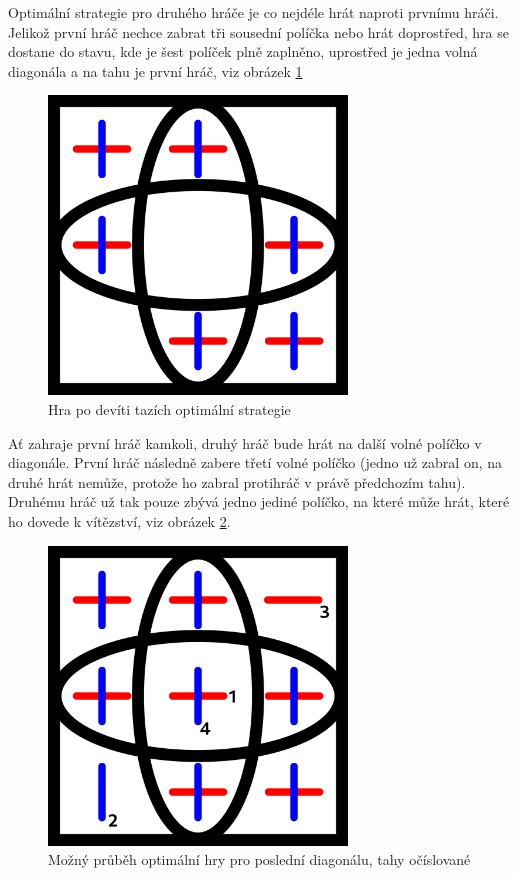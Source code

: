 Optimální strategie pro druhého hráče je co nejdéle hrát naproti prvnímu hráči.
Jelikož první hráč nechce zabrat tři sousední políčka nebo hrát doprostřed, hra
se dostane do stavu, kde je šest políček plně zaplněno, uprostřed je jedna
volná diagonála a na tahu je první hráč, viz obrázek \ref{fig:empty-diagonal}


\begin{figure}[h]
    \centering
    \includegraphics[width=300px]{img/empty-diagonal.png}
    \caption{Hra po devíti tazích optimální strategie}
    \label{fig:empty-diagonal}
\end{figure}

Ať zahraje první hráč kamkoli, druhý hráč bude hrát na další volné políčko v
diagonále. První hráč následně zabere třetí volné políčko (jedno už zabral on,
na druhé hrát nemůže, protože ho zabral protihráč v právě předchozím tahu).
Druhému hráč už tak pouze zbývá jedno jediné políčko, na které může hrát, které
ho dovede k vítězství, viz obrázek \ref{fig:last-diagonal}.

\begin{figure}[h]
    \centering
    \includegraphics[width=300px]{img/last-diagonal.png}
    \caption{Možný průběh optimální hry pro poslední diagonálu, tahy očíslované}
    \label{fig:last-diagonal}
\end{figure}
